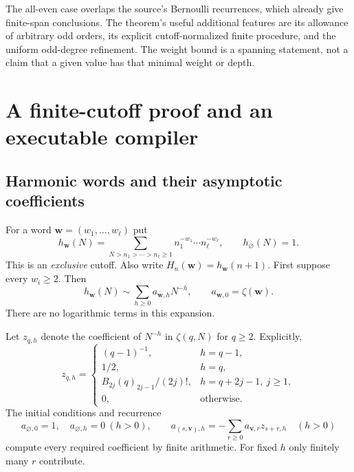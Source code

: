 \documentclass[11pt,letterpaper]{article}
\numberwithin{equation}{section}
\theoremstyle{definition}\newtheorem{definition}[theorem]{Definition}
\theoremstyle{remark}\newtheorem{remark}[theorem]{Remark}
\begin{document}
The all-even case overlaps the source's Bernoulli recurrences, which
already give finite-span conclusions. The theorem's useful additional
features are its allowance of arbitrary odd orders, its explicit
cutoff-normalized finite procedure, and the uniform odd-degree
refinement. The weight bound is a spanning statement, not a claim
that a given value has that minimal weight or depth.

\section{A finite-cutoff proof and an executable compiler}
\label{sec:compiler}

\subsection{Harmonic words and their asymptotic coefficients}

For a word $\boldsymbol w=(w_1,\ldots,w_\ell)$ put
\[
 h_{\boldsymbol w}(N)=
 \sum_{N>n_1>\cdots>n_\ell\ge1}
       n_1^{-w_1}\cdots n_\ell^{-w_\ell},\qquad
 h_{\varnothing}(N)=1.
\]
This is an \emph{exclusive} cutoff. Also write
$H_n(\boldsymbol w)=h_{\boldsymbol w}(n+1)$.
First suppose every $w_i\ge2$. Then
\begin{equation}\label{eq:h-asymptotic}
 h_{\boldsymbol w}(N)\sim\sum_{h\ge0}a_{\boldsymbol w,h}N^{-h},
 \qquad a_{\boldsymbol w,0}=\zeta(\boldsymbol w).
\end{equation}
There are no logarithmic terms in this expansion.

Let $z_{q,h}$ denote the coefficient of $N^{-h}$ in
$\zeta(q,N)$ for $q\ge2$. Explicitly,
\begin{equation}\label{eq:hurwitz-coeff}
 z_{q,h}=
 \begin{cases}
 (q-1)^{-1},&h=q-1,\\
 1/2,&h=q,\\
 B_{2j}(q)_{2j-1}/(2j)!,&h=q+2j-1,\ j\ge1,\\
 0,&\text{otherwise}.
 \end{cases}
\end{equation}
The initial conditions and recurrence
\begin{equation}\label{eq:a-recursion}
 a_{\varnothing,0}=1,\quad a_{\varnothing,h}=0\ (h>0),\qquad
 a_{(s,\boldsymbol v),h}
 =-\sum_{r\ge0}a_{\boldsymbol v,r}z_{s+r,h}\quad(h>0)
\end{equation}
compute every required coefficient by finite arithmetic.
For fixed $h$ only finitely many $r$ contribute.
\end{document}
